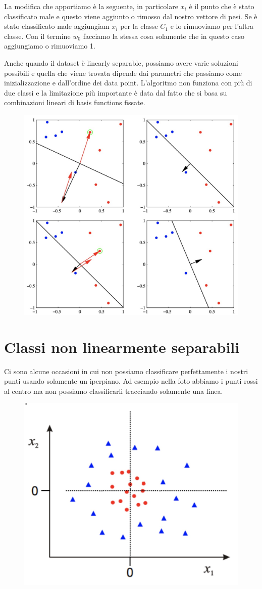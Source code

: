\documentclass[14pt]{extreport}
\begin{document}
La modifica che apportiamo è la seguente, in particolare $x_i$ è il punto che è stato classificato male e questo viene aggiunto o rimosso dal nostro
vettore di pesi. Se è stato classificato male aggiungiam $x_i$ per la classe $C_1$ e lo rimuoviamo per l'altra classe. Con il termine $w_0$ facciamo
la stessa cosa solamente che in questo caso aggiungiamo o rimuoviamo 1.
 
 Anche quando il dataset è linearly separable, possiamo avere varie soluzioni possibili e quella che viene trovata dipende dai parametri che passiamo
 come inizializzazione e dall'ordine dei data point. L'algoritmo non funziona con più di due classi e la limitazione più importante è data dal fatto
 che si basa su combinazioni lineari di basis functions fissate.

\begin{figure}[H]
\centering
\includegraphics[width=0.5\linewidth]{198.jpeg}
\end{figure}

\section{Classi non linearmente separabili}

Ci sono alcune occasioni in cui non possiamo classificare perfettamente i nostri punti usando solamente un iperpiano. Ad esempio nella foto abbiamo i
punti rossi al centro ma non possiamo classificarli tracciando solamente una linea.

\begin{figure}[H]
\centering
\includegraphics[width=0.4\linewidth]{153.jpeg}
\end{figure}
\end{document}
